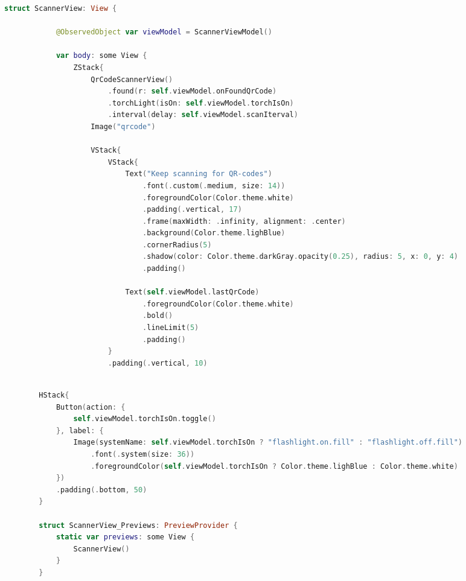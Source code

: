 \begin{spacing}{2}
\end{spacing}
\begin{minipage}{\textwidth}
    \linespread{0.8}\selectfont
    \begin{lstlisting}[language=swift]
        struct ScannerView: View {
    
            @ObservedObject var viewModel = ScannerViewModel()
            
            var body: some View {
                ZStack{
                    QrCodeScannerView()
                        .found(r: self.viewModel.onFoundQrCode)
                        .torchLight(isOn: self.viewModel.torchIsOn)
                        .interval(delay: self.viewModel.scanIterval)
                    Image("qrcode")
                    
                    VStack{
                        VStack{
                            Text("Keep scanning for QR-codes")
                                .font(.custom(.medium, size: 14))
                                .foregroundColor(Color.theme.white)
                                .padding(.vertical, 17)
                                .frame(maxWidth: .infinity, alignment: .center)
                                .background(Color.theme.lighBlue)
                                .cornerRadius(5)
                                .shadow(color: Color.theme.darkGray.opacity(0.25), radius: 5, x: 0, y: 4)
                                .padding()
                    
                            Text(self.viewModel.lastQrCode)
                                .foregroundColor(Color.theme.white)
                                .bold()
                                .lineLimit(5)
                                .padding()
                        }
                        .padding(.vertical, 10)
    \end{lstlisting}   
\end{minipage}


\begin{spacing}{2}
\end{spacing}
\hspace*{-10mm}
\begin{minipage}{\textwidth}
    \linespread{0.8}\selectfont
    \begin{lstlisting}[language=swift]
            
        HStack{
            Button(action: {
                self.viewModel.torchIsOn.toggle()
            }, label: {
                Image(systemName: self.viewModel.torchIsOn ? "flashlight.on.fill" : "flashlight.off.fill")
                    .font(.system(size: 36))
                    .foregroundColor(self.viewModel.torchIsOn ? Color.theme.lighBlue : Color.theme.white)
            })
            .padding(.bottom, 50)
        }
        
        struct ScannerView_Previews: PreviewProvider {
            static var previews: some View {
                ScannerView()
            }
        }
    \end{lstlisting}   
\end{minipage}

